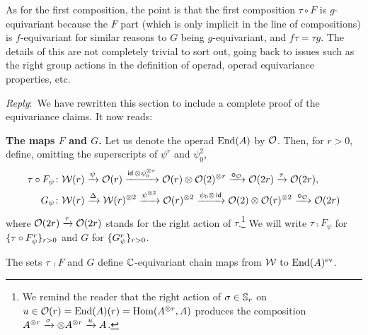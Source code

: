 \documentclass{amsart}
\newcommand{\ar}{\medskip\noindent\textit{Reply}:\ }
\begin{document}
\begin{enumerate}
	As for the first composition, the point is that the first composition \(\tau \circ F\) is \(g\)-equivariant because the \(F\) part (which is only implicit in the line of compositions) is \(f\)-equivariant for similar reasons to \(G\) being \(g\)-equivariant, and \(f \tau = \tau g\).
	The details of this are not completely trivial to sort out, going back to issues such as the right group actions in the definition of operad, operad equivariance properties, etc.

	\ar We have rewritten this section to include a complete proof of the equivariance claims.
	It now reads:

	\medskip\noindent \textbf{The maps $F$ and $G$.}
	Let us denote the operad $\mathrm{End}(A)$ by $\mathcal{O}$.
	Then, for $r > 0$, define, omitting the superscripts of $\psi^r$ and $\psi_0^2$,
	\begin{align*}
		\tau \mathbin{\circ} F_\psi \colon& \mathcal{W}(r) \xrightarrow{\psi} \mathcal{O}(r) \xrightarrow{\mathsf{id}\, \otimes \psi_0^{\otimes r}}
		\mathcal{O}(r) \otimes \mathcal{O}(2)^{\otimes r} \xrightarrow{\bm{\mathbin{\circ}}_{\mathcal{O}}}
		\mathcal{O}(2r) \xrightarrow{\tau} \mathcal{O}(2r), \\
		G_\psi \colon& \mathcal{W}(r) \xrightarrow{\Delta}
		\mathcal{W}(r)^{\otimes 2} \xrightarrow{\psi^{\otimes 2}}
		\mathcal{O}(r)^{\otimes 2} \xrightarrow{\psi_0 \otimes\, \mathsf{id}}
		\mathcal{O}(2) \otimes \mathcal{O}(r)^{\otimes 2} \xrightarrow{\bm{\mathbin{\circ}}_{\mathcal{O}}}
		\mathcal{O}(2r)
	\end{align*}
	where $\mathcal{O}(2r) \xrightarrow{\tau} \mathcal{O}(2r)$ stands for the right action of $\tau$.\footnote{\label{fn:symmetric_action_on_hom}
		We remind the reader that the right action of $\sigma \in \mathbb{S}_r$ on $u \in \mathcal{O}(r) = \mathrm{End}(A)(r) = \mathrm{Hom}(A^{\otimes r}, A)$ produces the composition $A^{\otimes r} \xrightarrow{\sigma} \otimes A^{\otimes r} \xrightarrow{u} A$.}
	We will write $\tau \comp F_\psi$ for $\{\tau \mathbin{\circ} F_\psi^r\}_{r>0}$ and $G$ for $\{G_\psi^r\}_{r>0}$.

	\begin{lemma*}
		The sets $\tau\, \comp F$ and $G$ define $\mathbb{C}$-equivariant chain maps from $\mathcal{W}$ to $\mathrm{End}(A)^{\mathrm{ev}}$.
	\end{lemma*}


\end{enumerate}
\end{document}
